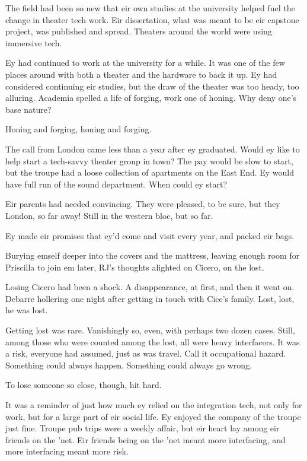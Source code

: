 The field had been so new that eir own studies at the university helped fuel the change in theater tech work. Eir dissertation, what was meant to be eir capstone project, was published and spread. Theaters around the world were using immersive tech.

Ey had continued to work at the university for a while. It was one of the few places around with both a theater and the hardware to back it up. Ey had considered continuing eir studies, but the draw of the theater was too heady, too alluring. Academia spelled a life of forging, work one of honing. Why deny one's base nature?

Honing and forging, honing and forging.

The call from London came less than a year after ey graduated. Would ey like to help start a tech-savvy theater group in town? The pay would be slow to start, but the troupe had a loose collection of apartments on the East End. Ey would have full run of the sound department. When could ey start?

Eir parents had needed convincing. They were pleased, to be sure, but they London, so far away! Still in the western bloc, but so far.

Ey made eir promises that ey'd come and visit every year, and packed eir bags.

Burying emself deeper into the covers and the mattress, leaving enough room for Priscilla to join em later, RJ's thoughts alighted on Cicero, on the lost.

Losing Cicero had been a shock. A disappearance, at first, and then it went on. Debarre hollering one night after getting in touch with Cice's family. Lost, lost, he was lost.

Getting lost was rare. Vanishingly so, even, with perhaps two dozen cases. Still, among those who were counted among the lost, all were heavy interfacers. It was a risk, everyone had assumed, just as was travel. Call it occupational hazard. Something could always happen. Something could always go wrong.

To lose someone so close, though, hit hard.

It was a reminder of just how much ey relied on the integration tech, not only for work, but for a large part of eir social life. Ey enjoyed the company of the troupe just fine. Troupe pub trips were a weekly affair, but eir heart lay among eir friends on the 'net. Eir friends being on the 'net meant more interfacing, and more interfacing meant more risk.

